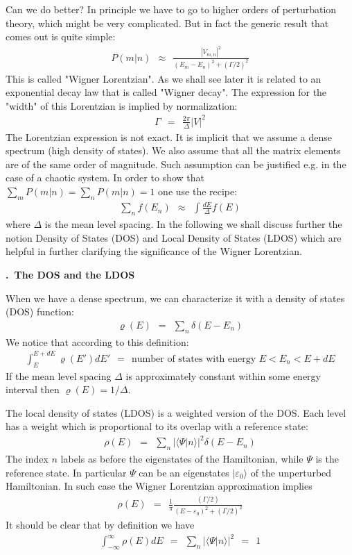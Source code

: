 \documentclass[onecolumn,fleqn, 11pt]{revtex4}
\newcommand{\gdos}{\varrho} \newcommand{\EPS}{\mathcal{E}}
\newcommand{\beq}{\begin{eqnarray}}
\newcommand{\eeq}{\end{eqnarray}}
\renewcommand{\thesubsection}{\arabic{subsection}}
\renewcommand{\thesubsubsection}{\arabic{subsubsection}}
\newcommand{\sheadC}[1]
{
\addtocounter{subsubsection}{1}
\vspace{5mm}
{\bf \thesubsection.\thesubsubsection \ #1}  
\nopagebreak
\phantomsection
}
\begin{document}
Can we do better? In principle we have to go to 
higher orders of perturbation theory, which might 
be very complicated. But in fact the generic result 
that comes out is quite simple: 
\beq
P(m|n) \ \ \approx \ \
\frac{|V_{m,n}|^2}{(E_m-E_n)^2 + (\Gamma/2)^2 } 
\eeq
This is called "Wigner Lorentzian". 
As we shall see later it is related to an exponential 
decay law that is called "Wigner decay".
The expression for the "width" of this Lorentzian 
is implied by normalization:
\beq
\Gamma \ \ = \ \ \frac{2\pi}{\Delta} |V|^2 
\eeq
The Lorentzian expression is not exact. It is implicit 
that we assume a dense spectrum (high density of states).  
We also assume that all the matrix elements are of the same 
order of magnitude. Such assumption can be 
justified e.g. in the case of a chaotic system. 
In order to show that $\sum_m P(m|n) = \sum_n P(m|n) = 1$ one use the recipe:
\beq
\sum_{n} f(E_n) \ \ \approx \ \ \int \frac{dE}{\Delta} f(E) 
\eeq
where $\Delta$ is the mean level spacing.
In the following we shall discuss further 
the notion Density of States (DOS) and 
Local  Density of States (LDOS) which are 
helpful in further clarifying the significance 
of the Wigner Lorentzian.



\sheadC{The DOS and the LDOS} 

When we have a dense spectrum, we can characterize 
it with a density of states (DOS) function:
\beq
\gdos(E) \ \ = \ \ \sum_n \delta(E-E_n) 
\eeq
We notice that according to this definition:
\beq
\int^{E+dE}_E \gdos(E')dE' 
\ \ = \ \ \mbox{number of states with energy}\,\, E < E_n < E+dE 
\eeq
If the mean level spacing ${\Delta}$ is approximately 
constant within some energy interval then ${\gdos(E)=1/\Delta}$. 


The local density of states (LDOS) is a weighted version 
of the DOS. Each level has a weight which is proportional 
to its overlap with a reference state:  
\beq
\rho(E) \ \ = \ \ \sum_{n} |\langle \Psi | n \rangle|^2  \delta(E-E_n) 
\eeq
The index $n$ labels as before the eigenstates 
of the Hamiltonian, while $\Psi$ is the reference state.
In particular $\Psi$ can be an eigenstates $|\varepsilon_0 \rangle$ 
of the unperturbed Hamiltonian. In such case 
the Wigner Lorentzian approximation implies
\beq
\rho(E) \ \ = \ \ \frac{1}{\pi}\frac{(\Gamma/2)}{ (E-\varepsilon_0)^2 + (\Gamma/2)^2} 
\eeq
It should be clear that by definition we have 
\beq
\int_{-\infty}^{\infty} \rho(E) dE \ \ = \ \ \sum_{n} |\langle \Psi | n \rangle|^2  \ \ = \ \ 1 
\eeq
\end{document}
